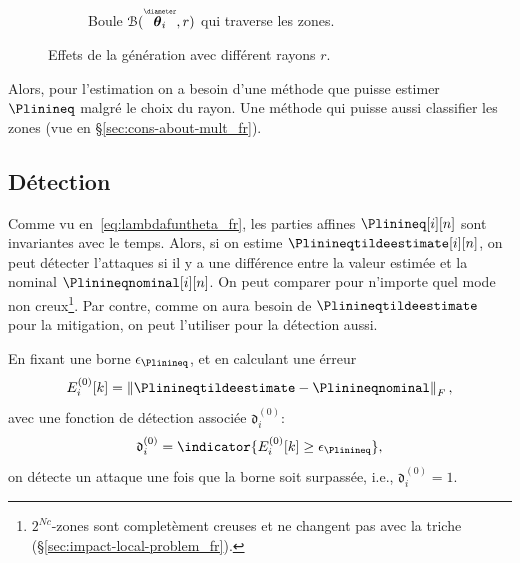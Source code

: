 \documentclass[../main.tex]{subfiles}
\begin{document}
\begin{figure}[h]
\begin{subfigure}{0.4\textwidth}
    \caption{Boule $\set{B}(\thetairestricted,r)$ qui traverse les zones.}\label{fig:ball_around_theta_restricted_traversing_fr}
  \end{subfigure}
  \caption{Effets de la génération avec différent rayons $r$.}
\end{figure}

Alors, pour l'estimation on a besoin d'une méthode que puisse estimer $\Plinineq$ malgré le choix du rayon.
Une méthode qui puisse aussi classifier les zones (vue en \S\ref{sec:cons-about-mult_fr}).

\subsection{Détection}\label{sec:detection_ineq_fr}

Comme vu en~\eqref{eq:lambdafuntheta_fr}, les parties affines $\Plinineq[i][n]$ sont invariantes avec le temps.
Alors, si on estime $\Plinineqtildeestimate[i][n]$, on peut détecter l'attaques si il y a une différence entre la valeur estimée et la nominal $\Plinineqnominal[i][n]$.
On peut comparer pour n'importe quel mode non creux\footnote{$2^{Nc}$-zones sont completèment creuses et ne changent pas avec la triche (\S\ref{sec:impact-local-problem_fr}).}.
Par contre, comme on aura besoin de $\Plinineqtildeestimate$ pour la mitigation, on peut l'utiliser pour la détection aussi.

En fixant une borne $\epsilon_{\Plinineq}$, et en calculant une érreur
\begin{equation}
  E_{i}^{(0)}[k] =\norm{\Plinineqtildeestimate-\Plinineqnominal}_{F},
\end{equation}
avec une fonction de détection associée $\mathfrak{d}_{i}^{(0)}$:
\begin{equation}
  \label{eq:detection_ineq}
  \mathfrak{d}_{i}^{(0)}=\indicator{E_{i}^{(0)}[k]\geq\epsilon_{\Plinineq}},
\end{equation}
on détecte un attaque une fois que la borne soit surpassée, i.e., $\mathfrak{d}_{i}^{(0)}=1$.
\end{document}
